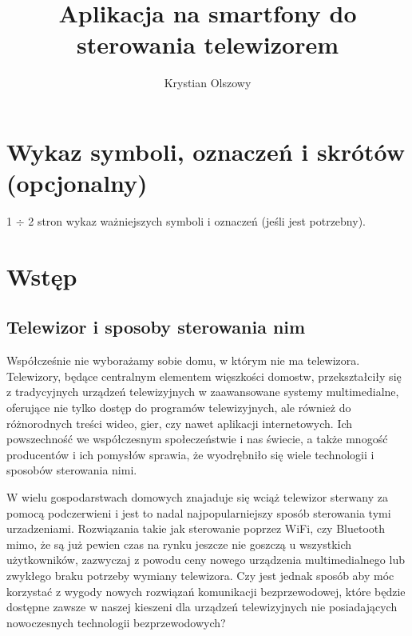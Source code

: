 \documentclass[12pt,twoside]{article}
\author{Krystian Olszowy}
\title{Aplikacja na smartfony do sterowania telewizorem}
\begin{document}
\maketitle

\blankpage

\tableofcontents

\clearpage
\blankpage


\section*{Wykaz symboli, oznaczeń i skrótów (opcjonalny)}
%

1 $\div$ 2 stron wykaz ważniejszych symboli i oznaczeń (jeśli jest potrzebny).
\clearpage

\section{Wstęp}
\subsection{Telewizor i sposoby sterowania nim}
{Współcześnie nie wyborażamy sobie domu, w którym nie ma telewizora. Telewizory, będące 
centralnym elementem więszkości domostw, przekształciły się z tradycyjnych urządzeń 
telewizyjnych w zaawansowane systemy multimedialne, oferujące nie tylko dostęp do programów telewizyjnych,
ale również do różnorodnych treści wideo, gier, czy nawet aplikacji internetowych. 
Ich powszechność we współczesnym społeczeństwie i nas świecie, a także mnogość producentów i ich pomysłów 
sprawia, że wyodrębniło się wiele technologii i sposobów sterowania nimi.

W wielu gospodarstwach domowych znajaduje się wciąż telewizor sterwany za pomocą podczerwieni i jest
 to nadal najpopularniejszy sposób sterowania tymi urzadzeniami. Rozwiązania takie jak sterowanie poprzez WiFi, czy Bluetooth
 mimo, że są już pewien czas na rynku jeszcze nie goszczą u wszystkich użytkowników, zazwyczaj z powodu ceny
 nowego urządzenia multimedialnego lub zwykłego braku potrzeby wymiany telewizora. Czy jest jednak sposób aby
móc korzystać z wygody nowych rozwiązań komunikacji bezprzewodowej, które będzie dostępne zawsze w naszej kieszeni 
dla urządzeń telewizyjnych nie posiadających nowoczesnych technologii bezprzewodowych?
}
\end{document}
